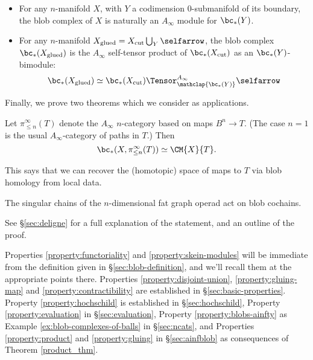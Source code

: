 \begin{property}
\label{property:gluing}%
\mbox{}%
\begin{itemize}
\item For any $n$-manifold $X$, with $Y$ a codimension $0$-submanifold of its boundary, the blob complex of $X$ is naturally an
$A_\infty$ module for $\bc_*(Y)$.

\item For any $n$-manifold $X_\text{glued} = X_\text{cut} \bigcup_Y \selfarrow$, the blob complex $\bc_*(X_\text{glued})$ is the $A_\infty$ self-tensor product of
$\bc_*(X_\text{cut})$ as an $\bc_*(Y)$-bimodule:
\begin{equation*}
\bc_*(X_\text{glued}) \simeq \bc_*(X_\text{cut}) \Tensor^{A_\infty}_{\mathclap{\bc_*(Y)}} \selfarrow
\end{equation*}
\end{itemize}
\end{property}

Finally, we prove two theorems which we consider as applications.

\begin{thm}
Let $\pi^\infty_{\le n}(T)$ denote the $A_\infty$ $n$-category based on maps 
$B^n \to T$.
(The case $n=1$ is the usual $A_\infty$-category of paths in $T$.)
Then 
$$\bc_*(X, \pi^\infty_{\le n}(T)) \simeq \CM{X}{T}.$$
\end{thm}

This says that we can recover the (homotopic) space of maps to $T$ via blob homology from local data.

\begin{thm}
\label{thm:deligne}
The singular chains of the $n$-dimensional fat graph operad act on blob cochains.
\end{thm}
See \S \ref{sec:deligne} for a full explanation of the statement, and an outline of the proof.

Properties \ref{property:functoriality} and \ref{property:skein-modules} will be immediate from the definition given in
\S \ref{sec:blob-definition}, and we'll recall them at the appropriate points there.
Properties \ref{property:disjoint-union}, \ref{property:gluing-map} and \ref{property:contractibility} are established in \S \ref{sec:basic-properties}.
Property \ref{property:hochschild} is established in \S \ref{sec:hochschild}, Property \ref{property:evaluation} in \S \ref{sec:evaluation}, Property \ref{property:blobs-ainfty} as Example \ref{ex:blob-complexes-of-balls} in \S \ref{sec:ncats},
and Properties \ref{property:product} and \ref{property:gluing} in \S \ref{sec:ainfblob} as consequences of Theorem \ref{product_thm}.

